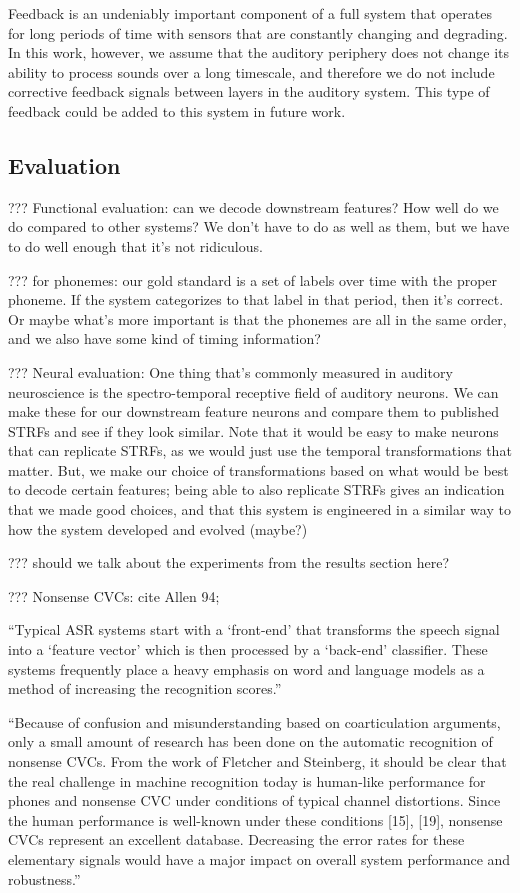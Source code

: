Feedback is an undeniably important
component of a full system that operates
for long periods of time with sensors
that are constantly changing and degrading.
In this work, however, we assume
that the auditory periphery does not change
its ability to process sounds over a long timescale,
and therefore we do not include corrective feedback
signals between layers in the auditory system.
This type of feedback could be added
to this system in future work.

\subsection{Evaluation}

??? Functional evaluation: can we decode downstream features?
How well do we do compared to other systems?
We don't have to do as well as them,
but we have to do well enough that it's not ridiculous.

??? for phonemes: our gold standard is a set of labels
over time with the proper phoneme.
If the system categorizes to that label in that period,
then it's correct. Or maybe what's more important
is that the phonemes are all in the same order,
and we also have some kind of timing information?

??? Neural evaluation: One thing that's commonly measured
in auditory neuroscience is the spectro-temporal receptive field
of auditory neurons. We can make these for our downstream feature
neurons and compare them to published STRFs and see if they look similar.
Note that it would be easy to make neurons that can replicate STRFs,
as we would just use the temporal transformations that matter.
But, we make our choice of transformations based on what would
be best to decode certain features;
being able to also replicate STRFs gives an indication that
we made good choices, and that this system is engineered
in a similar way to how the system developed and evolved (maybe?)

??? should we talk about the experiments from the results section here?

??? Nonsense CVCs: cite Allen 94;

``Typical ASR systems start with a `front-end' that transforms
the speech signal into a `feature vector' which is then processed
by a `back-end' classifier. These systems frequently place a
heavy emphasis on word and language models as a method of
increasing the recognition scores.''

``Because of confusion and misunderstanding based on
coarticulation arguments, only a small amount of research
has been done on the automatic recognition of nonsense CVCs.
From the work of Fletcher and Steinberg, it should be clear
that the real challenge in machine recognition today is
human-like performance for phones and nonsense CVC
under conditions of typical channel distortions.
Since the human performance is well-known under
these conditions [15], [19], nonsense CVCs
represent an excellent database. Decreasing
the error rates for these elementary signals would have
a major impact on overall system performance and robustness.''

